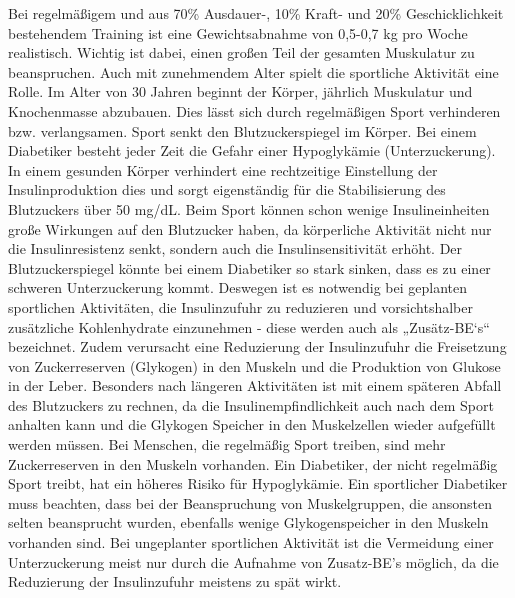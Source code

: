 	Bei regelmäßigem und aus 70\% Ausdauer-, 10\% Kraft- und 20\% Geschicklichkeit bestehendem Training ist eine Gewichtsabnahme von 0,5-0,7 kg pro Woche realistisch. Wichtig ist dabei, einen großen Teil der gesamten Muskulatur zu beanspruchen.\newline
	Auch mit zunehmendem Alter spielt die sportliche Aktivität eine Rolle. Im Alter von 30 Jahren beginnt der Körper, jährlich Muskulatur und Knochenmasse abzubauen.  Dies lässt sich durch regelmäßigen Sport verhinderen bzw. verlangsamen.\newline
	Sport senkt den Blutzuckerspiegel im Körper. Bei einem Diabetiker besteht jeder Zeit die Gefahr einer Hypoglykämie (Unterzuckerung). In einem gesunden Körper verhindert eine rechtzeitige Einstellung der Insulinproduktion dies und sorgt eigenständig für die Stabilisierung des Blutzuckers über 50 mg/dL. \cite{SG}\newline
	Beim Sport können schon wenige Insulineinheiten große Wirkungen auf den Blutzucker haben, da körperliche Aktivität nicht nur die Insulinresistenz senkt, sondern auch die Insulinsensitivität erhöht. Der Blutzuckerspiegel könnte bei einem Diabetiker so stark sinken, dass es zu einer schweren Unterzuckerung kommt. Deswegen ist es notwendig bei geplanten sportlichen Aktivitäten, die Insulinzufuhr zu reduzieren und vorsichtshalber zusätzliche Kohlenhydrate einzunehmen - diese werden auch als „Zusätz-BE‘s“ bezeichnet. Zudem verursacht eine Reduzierung der Insulinzufuhr die Freisetzung von Zuckerreserven (Glykogen) in den Muskeln und die Produktion von Glukose in der Leber. Besonders nach längeren Aktivitäten ist mit einem späteren Abfall des Blutzuckers zu rechnen, da die Insulinempfindlichkeit auch nach dem Sport anhalten kann und die Glykogen Speicher in den Muskelzellen wieder aufgefüllt werden müssen. \cite{RP}\newline
	Bei Menschen, die regelmäßig Sport treiben, sind mehr Zuckerreserven in den Muskeln vorhanden. Ein Diabetiker, der nicht regelmäßig Sport treibt, hat ein höheres Risiko für Hypoglykämie. Ein sportlicher Diabetiker muss beachten, dass bei der Beanspruchung von Muskelgruppen, die ansonsten selten beansprucht wurden, ebenfalls wenige Glykogenspeicher in den Muskeln vorhanden sind. \newline
	Bei ungeplanter sportlichen Aktivität ist die Vermeidung einer Unterzuckerung meist nur durch die Aufnahme von Zusatz-BE’s möglich, da die Reduzierung der Insulinzufuhr meistens zu spät wirkt.\newline
